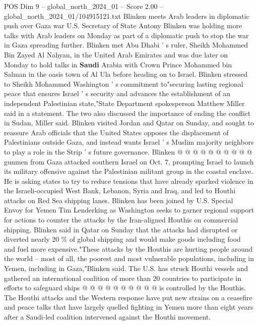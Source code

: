 \begin{textsample}{POS Dim 9 – global\_north\_2024\_01 – Score 2.00 – global\_north\_2024\_01/104915121.txt}  \label{ex:f9_pos_253}
Blinken meets Arab leaders in diplomatic push over Gaza war U.S.
Secretary of State Antony Blinken was holding more talks with Arab leaders on Monday as part of a diplomatic push to stop the war in Gaza spreading further.
Blinken met Abu Dhabi ' s ruler, Sheikh Mohammed Bin Zayed Al Nahyan, in the United Arab Emirates and was due later on Monday to hold talks in \textbf{Saudi} Arabia with Crown Prince Mohammed bin Salman in the oasis town of Al Ula before heading on to Israel.
Blinken stressed to Sheikh Mohammed Washington ' s commitment to"securing lasting regional peace that ensures Israel ' s security and advances the establishment of an independent Palestinian state,"State Department spokesperson Matthew Miller said in a statement.
The two also discussed the importance of ending the conflict in Sudan, Miller said.
Blinken visited Jordan and Qatar on Sunday, and sought to reassure Arab officials that the United States opposes the displacement of Palestinians outside Gaza, and instead wants Israel ' s Muslim majority neighbors to play a role in the Strip ' s future governance.
Blinken @ @ @ @ @ @ @ @ @ @ gunmen from Gaza attacked southern Israel on Oct. 7, prompting Israel to launch its military offensive against the Palestinian militant group in the coastal enclave.
He is asking states to try to reduce tensions that have already sparked violence in the Israeli-occupied West Bank, Lebanon, Syria and Iraq, and led to Houthi attacks on Red Sea shipping lanes.
Blinken has been joined by U.S.
Special Envoy for Yemen Tim Lenderking as Washington seeks to garner regional support for actions to counter the attacks by the Iran-aligned Houthis on commercial shipping.
Blinken said in Qatar on Sunday that the attacks had disrupted or diverted nearly 20 \% of global shipping and would make goods including food and fuel more expensive."These attacks by the Houthis are hurting people around the world -- most of all, the poorest and most vulnerable populations, including in Yemen, including in Gaza,"Blinken said.
The U.S. has struck Houthi vessels and gathered an international coalition of more than 20 countries to participate in efforts to safeguard ships @ @ @ @ @ @ @ @ @ @ is controlled by the Houthis.
The Houthi attacks and the Western response have put new strains on a ceasefire and peace talks that have largely quelled fighting in Yemen more than eight years after a Saudi-led coalition intervened against the Houthi movement.

\end{textsample}
